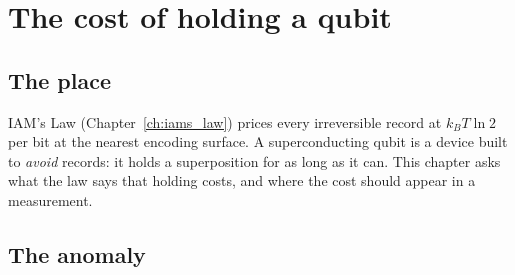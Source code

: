 \chapter{The cost of holding a qubit}\label{ch:xqp}

\section*{The place}
IAM's Law (Chapter~\ref{ch:iams_law}) prices every irreversible record at $k_BT\ln2$ per bit at the nearest encoding surface. A superconducting qubit
is a device built to \emph{avoid} records: it holds a superposition for as long as it can. This chapter asks what the law says that holding costs, and
where the cost should appear in a measurement.

\section{The anomaly}


